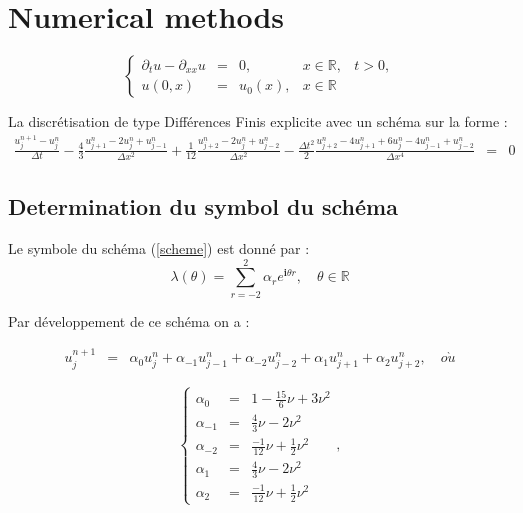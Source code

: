 \documentclass[a4paper,11pt]{article}
\begin{document}
\section{Numerical methods}

\begin{equation}
    \left\{
    \begin{array}{rclll}
        \partial_{t}u - \partial_{xx}u &=& 0, &x \in \mathbb{R}, & t>0, \\
        u(0, x) &=& u_{0}(x), &x \in \mathbb{R} &
    \end{array}
    \right.
\end{equation}

La discrétisation de type Différences Finis explicite avec un schéma sur la forme :
\begin{equation}
    \begin{array}{rcl}
        \frac{u^{n+1}_{j} - u^{n}_{j}}{\Delta t}
        -\frac{4}{3} \frac{u^{n}_{j+1} - 2u^{n}_{j} + u^{n}_{j-1}}{\Delta x^{2}}
        +\frac{1}{12} \frac{u^{n}_{j+2} - 2u^{n}_{j} + u^{n}_{j-2}}{\Delta x^{2}}
        -\frac{\Delta t^{2}}{2} \frac{u^{n}_{j+2} - 4u^{n}_{j+1} + 6u^{n}_{j}  - 4u^{n}_{j-1} + u^{n}_{j-2}}{\Delta x^{4}}  &=& 0 \label{scheme}
    \end{array}
\end{equation}


\subsection{Determination du symbol du schéma}

Le symbole du schéma (\ref{scheme}) est donné par :
\begin{equation*}
\lambda(\theta) = \sum \limits_{r=-2}^{2} \alpha_{r} e^{\mathbf{i} \theta r}, \quad \theta \in \mathbb{R}
\end{equation*}

Par développement de ce schéma on a :

\begin{equation*}
    \begin{array}{rcl}
        u^{n+1}_{j} &=& \alpha_{0} u^{n}_{j} + \alpha_{-1} u^{n}_{j-1} + \alpha_{-2} u^{n}_{j-2} + \alpha_{1} u^{n}_{j+1}  + \alpha_{2} u^{n}_{j+2}, \quad o\grave{u}
    \end{array}
\end{equation*}

\begin{equation*}
    \left\{
    \begin{array}{rcl}
        \alpha_{0} &=& 1 - \scriptstyle \frac{15}{6} \nu + 3 \nu^{2} \\
        \alpha_{-1} &=& \scriptstyle \frac{4}{3} \nu - 2 \nu^{2} \\
        \alpha_{-2} &=& \scriptstyle \frac{-1}{12} \nu + \frac{1}{2} \nu^{2} \\
        \alpha_{1} &=& \scriptstyle \frac{4}{3} \nu - 2 \nu^{2} \\
        \alpha_{2} &=& \scriptstyle \frac{-1}{12} \nu + \frac{1}{2} \nu^{2}
    \end{array}
    \right.,
\end{equation*}
\end{document}
